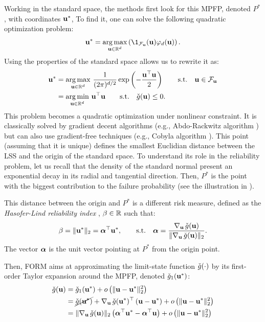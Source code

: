 Working in the standard space, the methods first look for this MPFP, denoted $P^*$, with coordinates ${\bf u}^*$, 
To find it, one can solve the following quadratic optimization problem: 
\begin{equation}
    \bu^* = \argmax_{\bu \in \R^d} \left(\1_{\iF_\bu}(\bu) \varphi_d(\bu)\right).
\end{equation}
Using the properties of the standard space allows us to rewrite it as: 
\begin{align}
    {\bf u}^* &= \operatorname*{arg\,max}_{{\bf u} \in \mathbb{R}^d} \, \frac{1}{(2\pi)^{d/2}} \exp\left(-\frac{{\bf u}^\top {\bf u} }{2} \right) \qquad \mathrm{s.t.} \quad {\bf u} \in \mathcal{F}_{{\bf u}}\\
          &= \operatorname*{arg\,min}_{{\bf u} \in \mathbb{R}^d} \, {\bf u}^\top {\bf u} \qquad \mathrm{s.t.} \quad \check{g}({\bf u}) \leq 0.
\end{align}
This problem becomes a quadratic optimization under nonlinear constraint. 
It is classically solved by gradient decent algorithms (e.g., Abdo-Rackwitz algorithm \citep{abdo_rack_1991}) but can also use gradient-free techniques (e.g., Cobyla algorithm \citep{powell_1994}).
This point (assuming that it is unique) defines the smallest Euclidian distance between the LSS and the origin of the standard space.
To understand its role in the reliability problem, let us recall that the density of the standard normal present an exponential decay in its radial and tangential direction.
Then, $P^*$ is the point with the biggest contribution to the failure probability (see the illustration in ). 

This distance between the origin and $P^*$ is a different risk measure, defined as the \textit{Hasofer-Lind reliability index} \citep{lemaire_2013}, $\beta \in \mathbb{R}$ such that:
\begin{equation}
    \beta = \Vert {\bf u}^* \Vert_2 = {\boldsymbol{\alpha}} ^\top {\bf u}^*, \qquad \mathrm{s.t.} \quad
        {\boldsymbol{\alpha}} = \frac{\nabla_{{\bf u}} \,  \check{g}({\bf u})}{\Vert \nabla_{{\bf u}} \,  \check{g}({\bf u}) \Vert_2}.      
\end{equation}
The vector ${\boldsymbol{\alpha}}$ is the unit vector pointing at $P^*$ from the origin point. 

Then, FORM aims at approximating the limit-state function $\check{g}(\cdot)$ by its first-order Taylor expansion around the MPFP, denoted $\check{g}_1({\bf u}^*)$: 
\begin{equation}
    \begin{split}
        \check{g}({\bf u}) &= \check{g}_1({\bf u}^*) + o\left(\Vert {\bf u} - {\bf u}^* \Vert_2^2\right)\\
                 &= \cancel{\check{g}({\bf u}^*)} + \nabla_{{\bf u}} \,  \check{g}({\bf u}^*)^\top \left({\bf u} -{\bf u}^* \right) + o\left(\Vert {\bf u} - {\bf u}^* \Vert_2^2\right)\\
                 &= \Vert \nabla_{{\bf u}} \, \check{g}({\bf u}) \Vert_2 \left({\boldsymbol{\alpha}}^\top {\bf u}^* - {\boldsymbol{\alpha}}^\top {\bf u} \right) + o\left(\Vert {\bf u} - {\bf u}^* \Vert_2^2\right)
    \end{split}    
\end{equation}
 
